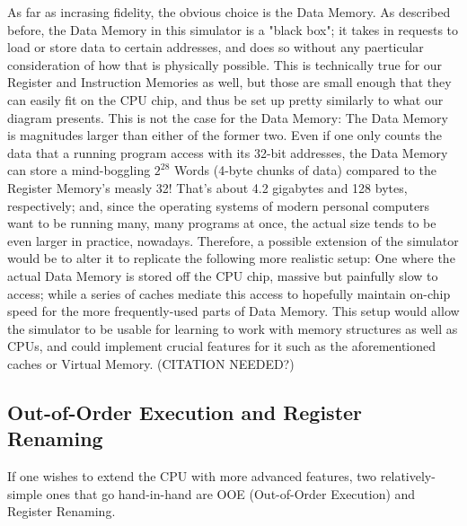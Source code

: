 \documentclass[12pt,twoside]{reedthesis}
\begin{document}
As far as incrasing fidelity, the obvious choice is the Data Memory. As described before, the Data Memory in this simulator is a "black box"; it takes in requests to load or store data to certain addresses, and does so without any paerticular consideration of how that is physically possible. This is technically true for our Register and Instruction Memories as well, but those are small enough that they can easily fit on the CPU chip, and thus be set up pretty similarly to what our diagram presents. This is not the case for the Data Memory: The Data Memory is magnitudes larger than either of the former two. Even if one only counts the data that a running program access with its 32-bit addresses, the Data Memory can store a mind-boggling $2^28$ Words (4-byte chunks of data) compared to the Register Memory's measly 32! That's about 4.2 gigabytes and 128 bytes, respectively; and, since the operating systems of modern personal computers want to be running many, many programs at once, the actual size tends to be even larger in practice, nowadays. Therefore, a possible extension of the simulator would be to alter it to replicate the following more realistic setup: One where the actual Data Memory is stored off the CPU chip, massive but painfully slow to access; while a series of caches mediate this access to hopefully maintain on-chip speed for the more frequently-used parts of Data Memory. This setup would allow the simulator to be usable for learning to work with memory structures as well as CPUs, and could implement crucial features for it such as the aforementioned caches or Virtual Memory.
(CITATION NEEDED?)

\subsection*{Out-of-Order Execution and Register Renaming}

If one wishes to extend the CPU with more advanced features, two relatively-simple ones that go hand-in-hand are OOE (Out-of-Order Execution) and Register Renaming.
\end{document}
